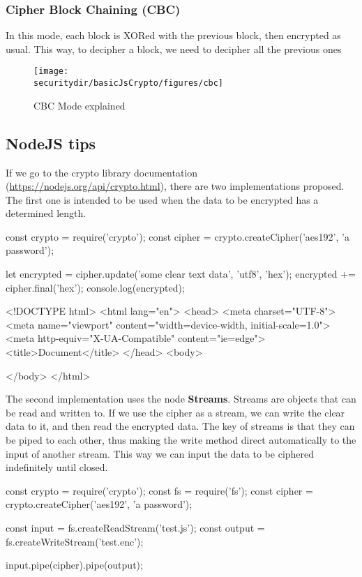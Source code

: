 \subsubsection{Cipher Block Chaining (CBC)}	

In this mode, each block is XORed with the previous block, then encrypted as usual. This way, to decipher a block, we need to decipher all the previous ones

\begin{figure}[htb]
	\begin{centering}
		\texttt{[image: \\securitydir/basicJsCrypto/figures/cbc]}
		\par\end{centering}
	\caption{\label{fig:cbc} CBC Mode explained}
\end{figure}

\subsection{NodeJS tips}
If we go to the crypto library documentation (\url{https://nodejs.org/api/crypto.html}), there are two implementations proposed. The first one is intended to be used when the data to be encrypted has a determined length.

\begin{js}
const crypto = require('crypto');
const cipher = crypto.createCipher('aes192', 'a password');

let encrypted = cipher.update('some clear text data', 'utf8', 'hex');
encrypted += cipher.final('hex');
console.log(encrypted);
\end{js}


\begin{html}
	<!DOCTYPE html>
	<html lang="en">
	<head>
	<meta charset="UTF-8">
	<meta name="viewport" content="width=device-width, initial-scale=1.0">
	<meta http-equiv="X-UA-Compatible" content="ie=edge">
	<title>Document</title>
	</head>
	<body>
	
	</body>
	</html>
\end{html}	

The second implementation uses the node \textbf{Streams}. Streams are objects that can be read and written to. If we use the cipher as a stream, we can write the clear data to it, and then read the encrypted data. The key of streams is that they can be piped to each other, thus making the write method direct automatically to the input of another stream. This way we can input the data to be ciphered indefinitely until closed.

\begin{js}
const crypto = require('crypto');
const fs = require('fs');
const cipher = crypto.createCipher('aes192', 'a password');

const input = fs.createReadStream('test.js');
const output = fs.createWriteStream('test.enc');

input.pipe(cipher).pipe(output);
\end{js}